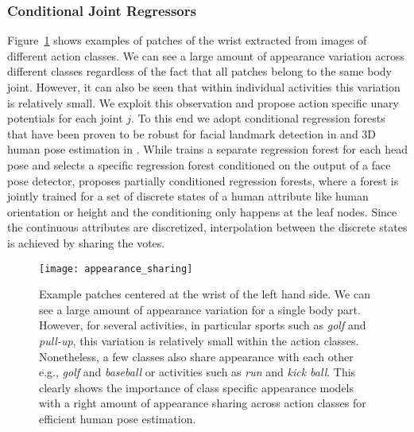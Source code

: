 \documentclass[a4paper, 10pt, conference]{ieeeconf}      \usepackage{FG2017}
\begin{document}
\subsubsection{Conditional Joint Regressors}\label{sec:cond_unary_potentials}
Figure~\ref{fig:appearance_sharing} shows examples of patches of the wrist extracted from images of different action classes. We can see a large amount of appearance variation across different classes regardless of the fact that all patches belong to the same body joint. However, it can also be seen that within individual activities this variation is relatively small. We exploit this observation and propose action specific unary potentials for each joint $j$. To this end we adopt conditional regression forests \cite{dantone_cvpr2012, minsun_cvpr2012} that have been proven to be robust for facial landmark detection in \cite{dantone_cvpr2012} and 3D human pose estimation in \cite{minsun_cvpr2012}. 
While \cite{dantone_cvpr2012} trains a separate regression forest for each head pose and selects a specific regression forest conditioned on the output of a face pose detector, \cite{minsun_cvpr2012} proposes partially conditioned regression forests, where a forest is jointly trained for a set of discrete states of a human attribute like human orientation or height and the conditioning only happens at the leaf nodes. Since the continuous attributes are discretized, interpolation between the discrete states is achieved by sharing the votes. 


\begin{figure}[t!]
\texttt{[image: appearance\_sharing]}
\centering
\captionsetup[figure]{skip=0pt}
\caption{Example patches centered at the wrist of the left hand side. We can see a large amount of appearance variation for a single body part. However, for several activities, in particular sports such as \textit{golf} and \textit{pull-up}, this variation is relatively small within the action classes. Nonetheless, a few classes also share appearance with each other e.g., \textit{golf} and \textit{baseball} or activities such as \textit{run} and \textit{kick ball}. This clearly shows the importance of class specific appearance models with a right amount of appearance sharing across action classes for efficient human pose estimation.}
\label{fig:appearance_sharing}
\end{figure}
\end{document}
